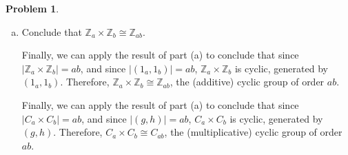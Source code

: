\documentclass[12pt]{article}
\theoremstyle{definition} %
\newtheorem{problem}{Problem}
\newcommand{\Z}{\mathbb{Z}}
\newenvironment{red}{\color{red}}{\ignorespacesafterend}
\newenvironment{xBlue}{\color{xBlue}}{\ignorespacesafterend}
\begin{document}
\begin{problem}
\begin{enumerate}[(a)]
        \item Conclude that $\Z_a \times \Z_b \cong \Z_{ab}.$

        \begin{red}
            Finally, we can apply the result of part (a) to conclude that since $|\Z_a \times \Z_b| = ab$, and since $|(1_a, 1_b)| = ab$, $\Z_a \times \Z_b$ is cyclic, generated by $(1_a, 1_b)$. Therefore, $\Z_a \times \Z_b \cong \Z_{ab}$, the (additive) cyclic group of order $ab$.
        \end{red}

        \begin{xBlue}
            Finally, we can apply the result of part (a) to conclude that since $|C_a \times C_b| = ab$, and since $|(g, h)| = ab$, $C_a \times C_b$ is cyclic, generated by $(g, h)$. Therefore, $C_a \times C_b \cong C_{ab}$, the (multiplicative) cyclic group of order $ab$.
        \end{xBlue}
    \end{enumerate}
\end{problem}
\end{document}
